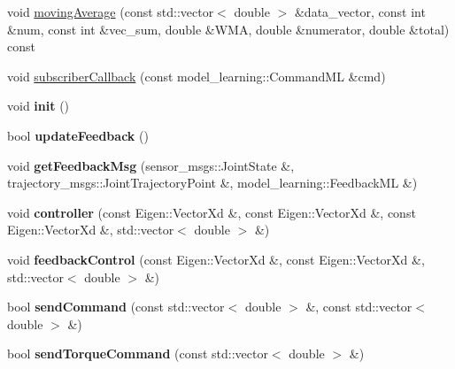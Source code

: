 \begin{DoxyCompactItemize}
\item 
void \hyperlink{classarmcontroller_a26e78647cafc275e2c633f8e115c28c7}{moving\+Average} (const std\+::vector$<$ double $>$ \&data\+\_\+vector, const int \&num, const int \&vec\+\_\+sum, double \&W\+MA, double \&numerator, double \&total) const
\item 
void \hyperlink{classarmcontroller_a53acf57dd669cb3d2634b3d508a0d439}{subscriber\+Callback} (const model\+\_\+learning\+::\+Command\+ML \&cmd)
\item 
\mbox{\label{classarmcontroller_a45794311f7ab89c67fe7423e07ea19d7}} 
void {\bfseries init} ()
\item 
\mbox{\label{classarmcontroller_a3cba85249ae1746aeac14d12b68becdc}} 
bool {\bfseries update\+Feedback} ()
\item 
\mbox{\label{classarmcontroller_af1970af350bf0902f57bdbf4089f3b13}} 
void {\bfseries get\+Feedback\+Msg} (sensor\+\_\+msgs\+::\+Joint\+State \&, trajectory\+\_\+msgs\+::\+Joint\+Trajectory\+Point \&, model\+\_\+learning\+::\+Feedback\+ML \&)
\item 
\mbox{\label{classarmcontroller_a5d9414eb9b6c92b3f19f177c44f9f6f1}} 
void {\bfseries controller} (const Eigen\+::\+Vector\+Xd \&, const Eigen\+::\+Vector\+Xd \&, const Eigen\+::\+Vector\+Xd \&, std\+::vector$<$ double $>$ \&)
\item 
\mbox{\label{classarmcontroller_a2385c8f95fd011e1206d2730615a4fad}} 
void {\bfseries feedback\+Control} (const Eigen\+::\+Vector\+Xd \&, const Eigen\+::\+Vector\+Xd \&, std\+::vector$<$ double $>$ \&)
\item 
\mbox{\label{classarmcontroller_a146f6d320cd7641c9fbc8c7b014a7ceb}} 
bool {\bfseries send\+Command} (const std\+::vector$<$ double $>$ \&, const std\+::vector$<$ double $>$ \&)
\item 
\mbox{\label{classarmcontroller_adb671e988673c3750f3c846cac593eba}} 
bool {\bfseries send\+Torque\+Command} (const std\+::vector$<$ double $>$ \&)
\item 
\mbox{\label{classarmcontroller_a9f48bad4ba4c88f294d1dd78df260fc7}} 

\end{DoxyCompactItemize}
